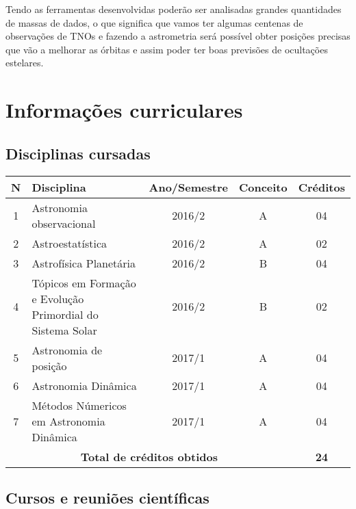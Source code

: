 \documentclass[a4paper, 11pt]{article}
\begin{document}
Tendo as ferramentas desenvolvidas poder\~ao ser analisadas grandes quantidades de massas de dados, o que significa que vamos ter algumas centenas de observa\c{c}\~oes de TNOs e fazendo a astrometria ser\'a poss\'ivel obter posi\c{c}\~oes precisas que v\~ao a melhorar as \'orbitas e assim poder ter boas previs\~oes de oculta\c{c}\~oes estelares. 

\newpage

\section{Informa\c{c}\~oes curriculares}

\subsection{Disciplinas cursadas}

\begin{center}
\begin{tabular}{clccc}
\toprule
\textbf{N}&$\hspace{2cm}$\textbf{Disciplina} &\textbf{Ano/Semestre}&\textbf{Conceito}& \textbf{Cr\'editos} \\ \midrule
1 & Astronomia observacional                                             & 2016/2 & A & 04 \\ 
2 & Astroestatística                                                     & 2016/2 & A & 02 \\ 
3 & Astrofísica Planetária                                               & 2016/2 & B & 04 \\ 
4 & Tópicos em Formação e Evolução Primordial do Sistema Solar           & 2016/2 & B & 02 \\
5 & Astronomia de posição                                                & 2017/1 & A & 04 \\ 
6 & Astronomia Dinâmica                                                  & 2017/1 & A & 04 \\ 
7 & Métodos Númericos em Astronomia Dinâmica                             & 2017/1 & A & 04 \\ \midrule 
\multicolumn{4}{c}{\textbf{Total de cr\'editos obtidos}}               & \textbf{24} \\ \bottomrule
\end{tabular}
\end{center}

\subsection{Cursos e reuni\~oes cient\'ificas}
\end{document}
